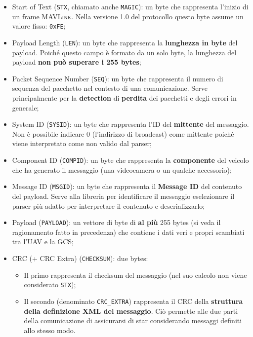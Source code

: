 \documentclass[a4paper, 12pt, oneside]{article}
\theoremstyle{definition}
\begin{document}
\begin{itemize}
    \item Start of Text (\texttt{STX}, chiamato anche \texttt{MAGIC}): un byte che rappresenta l'inizio di un frame \textsc{MAVLink}. Nella versione 1.0 del protocollo questo byte assume un valore fisso: \texttt{0xFE};
    \item Payload Length (\texttt{LEN}): un byte che rappresenta la \textbf{lunghezza in byte} del payload. Poiché questo campo è formato da un solo byte, la lunghezza del payload \textbf{non può superare i 255 bytes};
    \item Packet Sequence Number (\texttt{SEQ}): un byte che rappresenta il numero di sequenza del pacchetto nel contesto di una comunicazione. Serve principalmente per la \textbf{detection} di \textbf{perdita} dei pacchetti e degli errori in generale;
    \item System ID (\texttt{SYSID}): un byte che rappresenta l'ID del \textbf{mittente} del messaggio. Non è possibile indicare 0 (l'indirizzo di broadcast) come mittente poiché viene interpretato come non valido dal parser;
    \item Component ID (\texttt{COMPID}): un byte che rappresenta la \textbf{componente} del veicolo che ha generato il messaggio (una videocamera o un qualche accessorio);
    \item Message ID (\texttt{MSGID}): un byte che rappresenta il \textbf{Message ID} del contenuto del payload. Serve alla libreria per identificare il messaggio eselezionare il parser più adatto per interpretare il contenuto e deserializzarlo;
    \item Payload (\texttt{PAYLOAD}): un vettore di byte di \textbf{al più} 255 bytes (si veda il ragionamento fatto in precedenza) che contiene i dati veri e propri scambiati tra l'UAV e la GCS;
    \item CRC (+ CRC Extra) (\texttt{CHECKSUM}): due bytes: \begin{itemize}
        \item Il primo rappresenta il checksum del messaggio (nel suo calcolo non viene considerato \texttt{STX});
        \item Il secondo (denominato \texttt{CRC\_EXTRA}) rappresenta il CRC della \textbf{struttura della definizione XML del messaggio}. Ciò permette alle due parti della comunicazione di assicurarsi di star considerando messaggi definiti allo stesso modo.
    \end{itemize}
\end{itemize}
\end{document}
